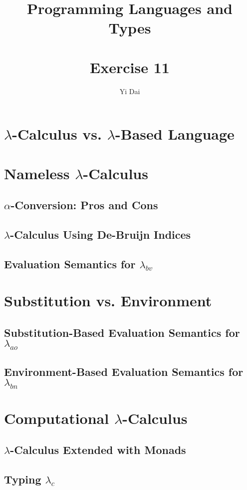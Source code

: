 \documentclass[a4paper,12pt]{article}
\title{
 Programming Languages and Types \\~\\
 \textbf{Exercise 11}
}
\author{
 Yi Dai
}
\begin{document}
\maketitle


\section{$\lambda$-Calculus vs. $\lambda$-Based Language}

\section{Nameless $\lambda$-Calculus}

\subsection{$\alpha$-Conversion: Pros and Cons}

\subsection{$\lambda$-Calculus Using De-Bruijn Indices}

\subsection{Evaluation Semantics for $\lambda_{bv}$}

\section{Substitution vs. Environment}

\subsection{Substitution-Based Evaluation Semantics for $\lambda_{ao}$}

\subsection{Environment-Based Evaluation Semantics for $\lambda_{bn}$}

\section{Computational $\lambda$-Calculus}

\subsection{$\lambda$-Calculus Extended with Monads}

\subsection{Typing $\lambda_c$}
\end{document}
